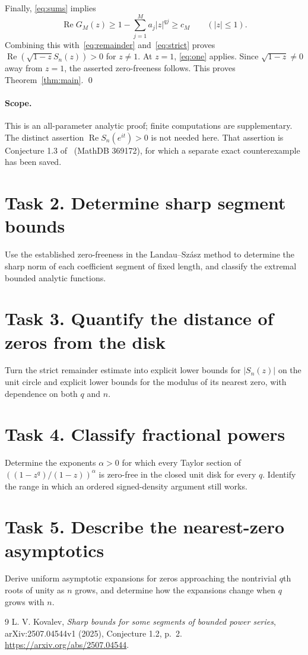 \documentclass[11pt]{article}
\newcommand{\Rea}{\operatorname{Re}}
\begin{document}
Finally, \eqref{eq:sums} implies
\[
 \Rea G_M(z)\geq1-\sum_{j=1}^M a_j|z|^{qj}\geq c_M
 \qquad (|z|\leq1).
\]
Combining this with~\eqref{eq:remainder} and~\eqref{eq:strict} proves
$\Rea(\sqrt{1-z}S_n(z))>0$ for $z\ne1$. At $z=1$,
\eqref{eq:one} applies. Since $\sqrt{1-z}\ne0$ away from $z=1$,
the asserted zero-freeness follows. This proves Theorem~\ref{thm:main}.
\qed

\paragraph{Scope.}
This is an all-parameter analytic proof; finite computations are supplementary.
The distinct assertion $\Rea S_n(e^{it})>0$ is not needed here.
That assertion is Conjecture 1.3 of~\cite{K} (MathDB 369172), for which a
separate exact counterexample has been saved.

\section*{Task 2. Determine sharp segment bounds}
Use the established zero-freeness in the Landau--Sz\'asz method to determine
the sharp norm of each coefficient segment of fixed length, and classify
the extremal bounded analytic functions.

\section*{Task 3. Quantify the distance of zeros from the disk}
Turn the strict remainder estimate into explicit lower bounds for
$|S_n(z)|$ on the unit circle and explicit lower bounds for the modulus
of its nearest zero, with dependence on both $q$ and $n$.

\section*{Task 4. Classify fractional powers}
Determine the exponents $\alpha>0$ for which every Taylor section of
$((1-z^q)/(1-z))^\alpha$ is zero-free in the closed unit disk for every $q$.
Identify the range in which an ordered signed-density argument still works.

\section*{Task 5. Describe the nearest-zero asymptotics}
Derive uniform asymptotic expansions for zeros approaching the nontrivial
$q$th roots of unity as $n$ grows, and determine how the expansions change
when $q$ grows with $n$.

\begin{thebibliography}{9}
L. V. Kovalev,
\emph{Sharp bounds for some segments of bounded power series},
arXiv:2507.04544v1 (2025), Conjecture 1.2, p.~2.
\url{https://arxiv.org/abs/2507.04544}.
\end{thebibliography}
\end{document}
